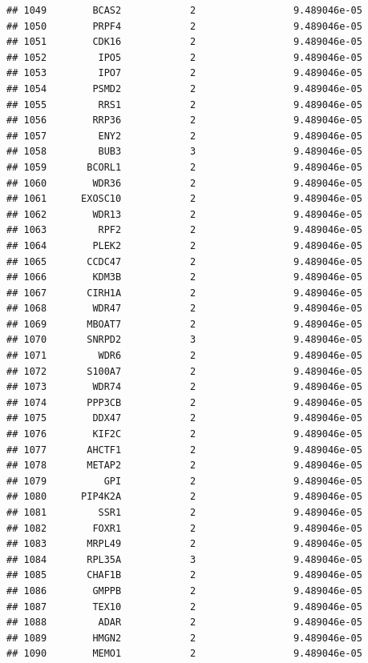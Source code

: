 \documentclass[
]{article}
\begin{document}
\begin{verbatim}
## 1049        BCAS2            2                 9.489046e-05
## 1050        PRPF4            2                 9.489046e-05
## 1051        CDK16            2                 9.489046e-05
## 1052         IPO5            2                 9.489046e-05
## 1053         IPO7            2                 9.489046e-05
## 1054        PSMD2            2                 9.489046e-05
## 1055         RRS1            2                 9.489046e-05
## 1056        RRP36            2                 9.489046e-05
## 1057         ENY2            2                 9.489046e-05
## 1058         BUB3            3                 9.489046e-05
## 1059       BCORL1            2                 9.489046e-05
## 1060        WDR36            2                 9.489046e-05
## 1061      EXOSC10            2                 9.489046e-05
## 1062        WDR13            2                 9.489046e-05
## 1063         RPF2            2                 9.489046e-05
## 1064        PLEK2            2                 9.489046e-05
## 1065       CCDC47            2                 9.489046e-05
## 1066        KDM3B            2                 9.489046e-05
## 1067       CIRH1A            2                 9.489046e-05
## 1068        WDR47            2                 9.489046e-05
## 1069       MBOAT7            2                 9.489046e-05
## 1070       SNRPD2            3                 9.489046e-05
## 1071         WDR6            2                 9.489046e-05
## 1072       S100A7            2                 9.489046e-05
## 1073        WDR74            2                 9.489046e-05
## 1074       PPP3CB            2                 9.489046e-05
## 1075        DDX47            2                 9.489046e-05
## 1076        KIF2C            2                 9.489046e-05
## 1077       AHCTF1            2                 9.489046e-05
## 1078       METAP2            2                 9.489046e-05
## 1079          GPI            2                 9.489046e-05
## 1080      PIP4K2A            2                 9.489046e-05
## 1081         SSR1            2                 9.489046e-05
## 1082        FOXR1            2                 9.489046e-05
## 1083       MRPL49            2                 9.489046e-05
## 1084       RPL35A            3                 9.489046e-05
## 1085       CHAF1B            2                 9.489046e-05
## 1086        GMPPB            2                 9.489046e-05
## 1087        TEX10            2                 9.489046e-05
## 1088         ADAR            2                 9.489046e-05
## 1089        HMGN2            2                 9.489046e-05
## 1090        MEMO1            2                 9.489046e-05

\end{verbatim}
\end{document}
